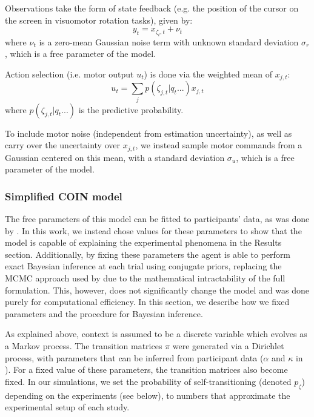 \documentclass[a4paper,doc,floatsintext,natbib]{apa6}
\begin{document}
Observations take the form of state feedback (e.g. the position of the cursor on the screen in visuomotor rotation tasks), given by:
\begin{equation}
y_t = x_{\zeta_t, t} + \nu_t
\end{equation}
where $\nu_t$ is a zero-mean Gaussian noise term with unknown standard deviation $\sigma_r$, which is a free parameter of the model.

Action selection (i.e. motor output $u_t$) is done via the weighted mean of $x_{j,t}$:
\begin{equation}
u_t  = \displaystyle\sum_{j}p(\zeta_{j,t} | q_t...) x_{j,t} \label{eqn:dist-comm}
\end{equation}
where $p(\zeta_{j,t} | q_t ...)$ is the predictive probability.

To include motor noise (independent from estimation uncertainty), as well as carry over the uncertainty over $x_{j,t}$, we instead sample motor commands from a Gaussian centered on this mean, with a standard deviation $\sigma_u$, which is a free parameter of the model.


\subsubsection{Simplified COIN model}
The free parameters of this model can be fitted to participants' data, as was done by \cite{Heald_Contextual_2021}. In this work, we instead chose values for these parameters to show that the model is capable of explaining the experimental phenomena in the Results section. Additionally, by fixing these parameters the agent is able to perform exact Bayesian inference at each trial using conjugate priors, replacing the MCMC approach used by \cite{Heald_Contextual_2021} due to the mathematical intractability of the full formulation. This, however, does not significantly change the model and was done purely for computational efficiency. In this section, we describe how we fixed parameters and the procedure for Bayesian inference.

As explained above, context is assumed to be a discrete variable which evolves as a Markov process. The transition matrices $\pi$ were generated via a Dirichlet process, with parameters that can be inferred from participant data ($\alpha$ and $\kappa$ in \cite{Heald_Contextual_2021}). For a fixed value of these parameters, the transition matrices also become fixed. In our simulations, we set the probability of self-transitioning (denoted $p_\zeta$) depending on the experiments (see below), to numbers that approximate the experimental setup of each study.
\end{document}
